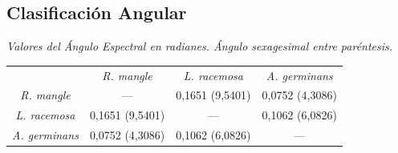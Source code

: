 \documentclass[12pt]{beamer}
\begin{document}
\subsection{Clasificación Angular}
\begin{frame}
	\begin{table}
		\centering
\textit{{\footnotesize Valores del Ángulo Espectral en radianes. Ángulo sexagesimal entre paréntesis.}}
		{\small \begin{tabular}{@{}cccc@{}}
			\toprule[0.4mm]
			& \textit{R. mangle} & \textit{L. racemosa} & \textit{A. germinans} \\
			\textit{R. mangle} & --- & 0,1651 (9,5401) & 0,0752 (4,3086) \\
			\textit{L. racemosa} & 0,1651 (9,5401) & --- & 0,1062 (6,0826) \\
			\textit{A. germinans} & 0,0752 (4,3086) & 0,1062 (6,0826) & --- \\
			\bottomrule[0.4mm]
		\end{tabular}}
	\end{table}
\end{frame}
\end{document}
